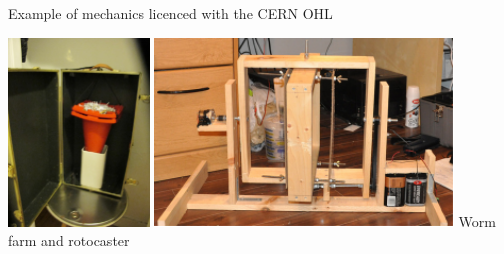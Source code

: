 \documentclass[compress,red]{beamer}
\begin{document}
\begin{frame}{Example of mechanics licenced with the CERN OHL}
  \begin{center}
    \includegraphics[height=5cm]{ohwr/worm-farm-008.pdf}
    \includegraphics[height=5cm]{ohwr/rotocaster.pdf}
   Worm farm and rotocaster
 \end{center} 
\end{frame}
\end{document}

